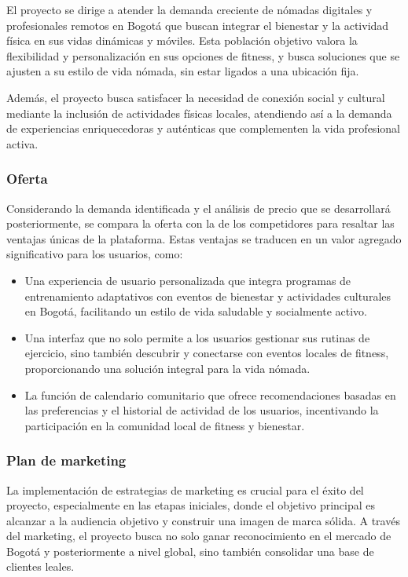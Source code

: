 {El proyecto se dirige a atender la demanda creciente de nómadas digitales y profesionales remotos en Bogotá que buscan integrar el bienestar y la actividad física en sus vidas dinámicas y móviles. Esta población objetivo valora la flexibilidad y personalización en sus opciones de fitness, y busca soluciones que se ajusten a su estilo de vida nómada, sin estar ligados a una ubicación fija. 

Además, el proyecto busca satisfacer la necesidad de conexión social y cultural mediante la inclusión de actividades físicas locales, atendiendo así a la demanda de experiencias enriquecedoras y auténticas que complementen la vida profesional activa. 

\subsubsection*{Oferta}

Considerando la demanda identificada y el análisis de precio que se desarrollará posteriormente, se compara la oferta con la de los competidores para resaltar las ventajas únicas de la plataforma. Estas ventajas se traducen en un valor agregado significativo para los usuarios, como:

\begin{itemize}
    \item Una experiencia de usuario personalizada que integra programas de entrenamiento adaptativos con eventos de bienestar y actividades culturales en Bogotá, facilitando un estilo de vida saludable y socialmente activo.
    
    \item Una interfaz que no solo permite a los usuarios gestionar sus rutinas de ejercicio, sino también descubrir y conectarse con eventos locales de fitness, proporcionando una solución integral para la vida nómada.
    
    \item La función de calendario comunitario que ofrece recomendaciones basadas en las preferencias y el historial de actividad de los usuarios, incentivando la participación en la comunidad local de fitness y bienestar.
\end{itemize}

\subsubsection*{Plan de marketing}

La implementación de estrategias de marketing es crucial para el éxito del proyecto, especialmente en las etapas iniciales, donde el objetivo principal es alcanzar a la audiencia objetivo y construir una imagen de marca sólida. A través del marketing, el proyecto busca no solo ganar reconocimiento en el mercado de Bogotá y posteriormente a nivel global, sino también consolidar una base de clientes leales.

}
